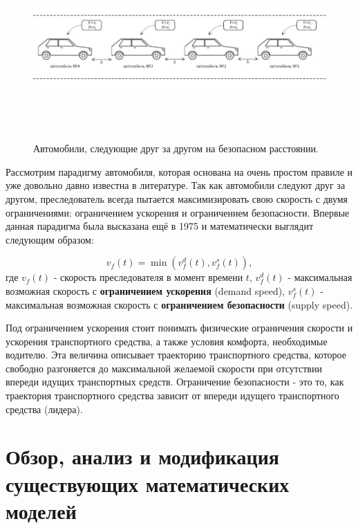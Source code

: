 \documentclass[12pt, a4paper]{extarticle}
\numberwithin{equation}{section}
\numberwithin{figure}{section}
\begin{document}
\begin{figure}[h!]  
	\begin{center}
		\includegraphics[keepaspectratio,width=160mm,height=70mm]{Images/car_following.pdf}
	\end{center}
	\caption{Автомобили, следующие друг за другом на безопасном расстоянии.}
	\label{car_following}
\end{figure}

Рассмотрим парадигму автомобиля, которая основана на очень простом правиле и уже довольно давно известна в литературе. Так как автомобили следуют друг за другом, преследователь всегда пытается максимизировать свою скорость с двумя ограничениями: ограничением ускорения и ограничением безопасности. Впервые данная парадигма была высказана ещё в 1975 \cite{GippsModel} и математически выглядит следующим образом:

\begin{equation*} \label{following_paradigm}
v_f(t) = \min(v_f^d(t), v_f^s(t)),
\end{equation*}
где $v_f(t)$ - скорость преследователя в момент времени $t$, $v_f^d(t)$ - максимальная возможная скорость с \textbf{ограничением ускорения} (demand speed), $v_f^s(t)$ - максимальная возможная скорость с \textbf{ограничением безопасности} (supply speed).

Под ограничением ускорения стоит понимать физические ограничения скорости и ускорения транспортного средства, а также условия комфорта, необходимые водителю. Эта величина описывает траекторию транспортного средства, которое свободно разгоняется до максимальной желаемой скорости при отсутствии впереди идущих транспортных средств. Ограничение безопасности - это то, как траектория транспортного средства зависит от впереди идущего транспортного средства (лидера).

\section{Обзор, анализ и модификация существующих математических моделей}
\end{document}
